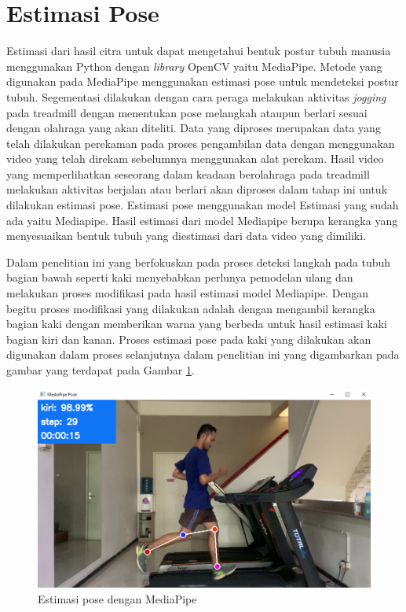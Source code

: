 \section{Estimasi Pose}
\label{sec:EstimasiPose}

Estimasi dari hasil citra untuk dapat mengetahui bentuk postur tubuh manusia menggunakan Python dengan \emph{library} OpenCV yaitu MediaPipe. Metode yang digunakan pada MediaPipe menggunakan estimasi pose untuk mendeteksi postur tubuh. Segementasi dilakukan dengan cara peraga melakukan aktivitas \emph{jogging} pada treadmill dengan menentukan pose melangkah ataupun berlari sesuai dengan olahraga yang akan diteliti. Data yang diproses merupakan data yang telah dilakukan perekaman pada proses pengambilan data dengan menggunakan video yang telah direkam sebelumnya menggunakan alat perekam. Hasil video yang memperlihatkan seseorang dalam keadaan berolahraga pada treadmill melakukan aktivitas berjalan atau berlari akan diproses dalam tahap ini untuk dilakukan estimasi pose. Estimasi pose menggunakan model Estimasi yang sudah ada yaitu Mediapipe. Hasil estimasi dari model Mediapipe berupa kerangka yang menyesuaikan bentuk tubuh yang diestimasi dari data video yang dimiliki.

Dalam penelitian ini yang berfokuskan pada proses deteksi langkah pada tubuh bagian bawah seperti kaki menyebabkan perlunya pemodelan ulang dan melakukan proses modifikasi pada hasil estimasi model Mediapipe. Dengan begitu proses modifikasi yang dilakukan adalah dengan mengambil kerangka bagian kaki dengan memberikan warna yang berbeda untuk hasil estimasi kaki bagian kiri dan kanan. Proses estimasi pose pada kaki yang dilakukan akan digunakan dalam proses selanjutnya dalam penelitian ini yang digambarkan pada gambar yang terdapat pada Gambar \ref{fig:DeteksiEstimasi}.

\begin{figure}[H]
  \centering
  \includegraphics[scale=0.45]{gambar/deteksi pose.png}
  \caption{Estimasi pose dengan MediaPipe}
  \label{fig:DeteksiEstimasi}
\end{figure}

